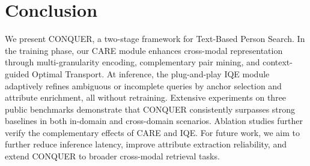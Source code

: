 \documentclass{article}
\begin{document}
\section{Conclusion}
We present CONQUER, a two-stage framework for Text-Based Person Search. In the training phase, our CARE module enhances cross-modal representation through multi-granularity encoding, complementary pair mining, and context-guided Optimal Transport. At inference, the plug-and-play IQE module adaptively refines ambiguous or incomplete queries by anchor selection and attribute enrichment, all without retraining. Extensive experiments on three public benchmarks demonstrate that CONQUER consistently surpasses strong baselines in both in-domain and cross-domain scenarios. Ablation studies further verify the complementary effects of CARE and IQE. For future work, we aim to further reduce inference latency, improve attribute extraction reliability, and extend CONQUER to broader cross-modal retrieval tasks.








\end{document}

